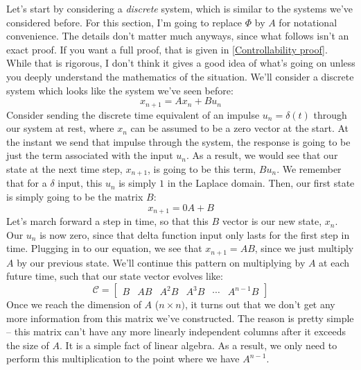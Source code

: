 Let's start by considering a \textit{discrete} system, which is similar to the systems we've considered before. For this section, I'm going to replace $\Phi$ by $A$ for notational convenience. The details don't matter much anyways, since what follows isn't an exact proof. If you want a full proof, that is given in \autoref{Controllability proof}. While that is rigorous, I don't think it gives a good idea of what's going on unless you deeply understand the mathematics of the situation. We'll consider a discrete system which looks like the system we've seen before:
$$x_{n+1}=Ax_n+Bu_n$$
Consider sending the discrete time equivalent of an impulse $u_n=\delta(t)$ through our system at rest, where $x_n$ can be assumed to be a zero vector at the start. At the instant we send that impulse through the system, the response is going to be just the term associated with the input $u_n$. As a result, we would see that our state at the next time step, $x_{n+1}$, is going to be this term, $Bu_n$. We remember that for a $\delta$ input, this $u_n$ is simply $1$ in the Laplace domain. Then, our first state is simply going to be the matrix $B$:
$$x_{n+1}=0A+B$$
Let's march forward a step in time, so that this $B$ vector is our new state, $x_n$. Our $u_n$ is now zero, since that delta function input only lasts for the first step in time. Plugging in to our equation, we see that $x_{n+1}=AB$, since we just multiply $A$ by our previous state. We'll continue this pattern on multiplying by $A$ at each future time, such that our state vector evolves like:
$$\mathcal{C}=\begin{bmatrix}
    B&AB&A^2B&A^3B&\cdots&A^{n-1}B
\end{bmatrix}$$
Once we reach the dimension of $A$ ($n\times n)$, it turns out that we don't get any more information from this matrix we've constructed. The reason is pretty simple -- this matrix can't have any more linearly independent columns after it exceeds the size of $A$. It is a simple fact of linear algebra. As a result, we only need to perform this multiplication to the point where we have $A^{n-1}$.

